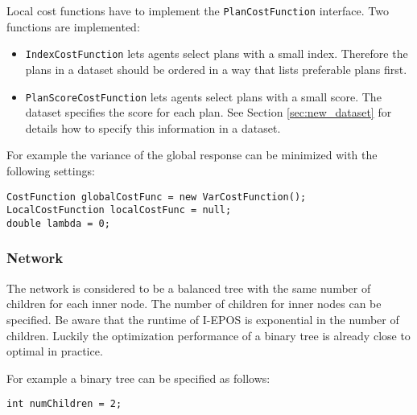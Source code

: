 \documentclass[11pt]{article} %
\newcommand{\code}{\texttt}
\begin{document}
Local cost functions have to implement the \code{PlanCostFunction} interface. Two functions are implemented:
\begin{itemize}
	\item \code{IndexCostFunction} lets agents select plans with a small index. Therefore the plans in a dataset should be ordered in a way that lists preferable plans first.
	\item \code{PlanScoreCostFunction} lets agents select plans with a small score. The dataset specifies the score for each plan. See Section \ref{sec:new_dataset} for details how to specify this information in a dataset.
\end{itemize}

\noindent For example the variance of the global response can be minimized with the following settings:
\begin{verbatim}
CostFunction globalCostFunc = new VarCostFunction();
LocalCostFunction localCostFunc = null;
double lambda = 0;
\end{verbatim}

\subsubsection*{Network}
The network is considered to be a balanced tree with the same number of children for each inner node. The number of children for inner nodes can be specified. Be aware that the runtime of I-EPOS is exponential in the number of children. Luckily the optimization performance of a binary tree is already close to optimal in practice.

For example a binary tree can be specified as follows:
\begin{verbatim}
int numChildren = 2;
\end{verbatim}
\end{document}
